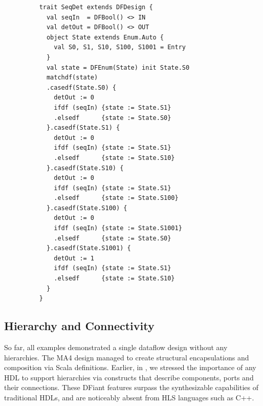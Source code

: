 \begin{figure}[t]
  \centering
  \captionsetup{justification=centering}    
  
  \begin{verbatim}
    trait SeqDet extends DFDesign {
      val seqIn  = DFBool() <> IN
      val detOut = DFBool() <> OUT
      object State extends Enum.Auto {
        val S0, S1, S10, S100, S1001 = Entry
      }
      val state = DFEnum(State) init State.S0
      matchdf(state)
      .casedf(State.S0) {
        detOut := 0
        ifdf (seqIn) {state := State.S1}
        .elsedf      {state := State.S0}
      }.casedf(State.S1) {
        detOut := 0
        ifdf (seqIn) {state := State.S1}
        .elsedf      {state := State.S10}
      }.casedf(State.S10) {
        detOut := 0
        ifdf (seqIn) {state := State.S1}
        .elsedf      {state := State.S100}
      }.casedf(State.S100) {
        detOut := 0
        ifdf (seqIn) {state := State.S1001}
        .elsedf      {state := State.S0}
      }.casedf(State.S1001) {
        detOut := 1
        ifdf (seqIn) {state := State.S1}
        .elsedf      {state := State.S10}
      }
    }
  \end{verbatim}
  \label{fig:SeqDet}
\end{figure}



\subsection{Hierarchy and Connectivity}
So far, all examples demonstrated a single dataflow design without any hierarchies. The MA4 design managed to create structural encapsulations and composition via Scala definitions. Earlier, in , we stressed the importance of any HDL to support hierarchies via constructs that describe components, ports and their connections. These DFiant features surpass the synthesizable capabilities of traditional HDLs, and are noticeably absent from HLS languages such as C++. 




